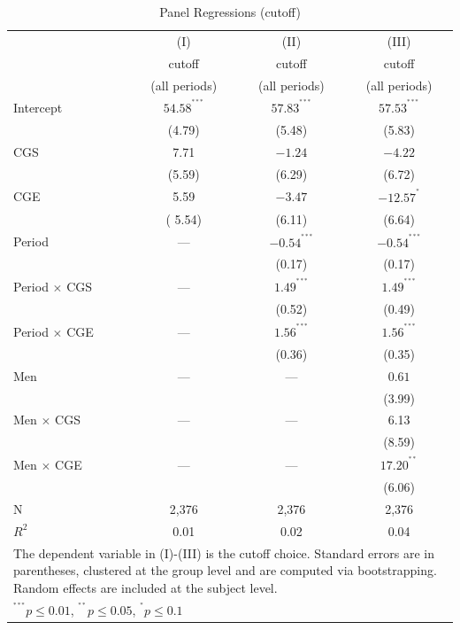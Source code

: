 \documentclass[12pt, letterpaper]{article}
\theoremstyle{plain}
\begin{document}
\begin{table}[ht]
\centering
\caption{Panel Regressions (cutoff)}
\footnotesize
\begin{tabular}{lccc}

  & (I) & (II) & (III) \\
&  cutoff & cutoff & cutoff   \\
&  (all periods) & (all periods)  & (all periods)   \\
    \hline
Intercept & $54.58^{^{***}}$ & $57.83^{^{***}}$ &  $ 57.53^{^{***}}$ \\
& (4.79) & (5.48) & (5.83) \\
CGS &  7.71 & $-1.24$ &  $-4.22$  \\
& (5.59) & (6.29) & (6.72) \\
CGE &  5.59 & $-3.47$ &  $-12.57^{^{*}}$ \\
& ( 5.54) &  (6.11) & (6.64) \\
Period & ---& $-0.54^{^{***}}$ & $-0.54^{^{***}}$ \\
& & (0.17)&  (0.17) \\
Period $\times$ CGS & ---& $1.49^{^{***}}$& $ 1.49^{^{***}}$ \\
& & (0.52) & (0.49)  \\
Period $\times$ CGE & ---& $1.56^{^{***}}$& $1.56^{^{***}}$\\
& & (0.36) & (0.35) \\
Men & --- &  --- & $0.61$  \\
& &  & (3.99) \\
Men $\times$ CGS & ---& --- &  6.13 \\
& & & (8.59) \\
Men $\times$ CGE & ---& --- & $17.20^{^{**}}$ \\
& & & (6.06)\\

\hline
N & 2,376 & 2,376 & 2,376 \\ 
$R^2$ & 0.01 & 0.02 & 0.04 \\
\hline
\hline
 \multicolumn{4}{p{.6\textwidth}}{\scriptsize{The dependent variable in (I)-(III)  is the cutoff choice. Standard errors are in parentheses, clustered at the group level and are computed via bootstrapping. Random effects are included at the subject level.}}\\ 
 \multicolumn{4}{p{0.4\textwidth}}{\scriptsize{ $^{^{***}}p\leq0.01$,
    $^{^{**}}p\leq0.05$, $^{^{*}}p\leq0.1$}} \\
\end{tabular}
\label{table:ols_cutoff}
\end{table}
\end{document}

